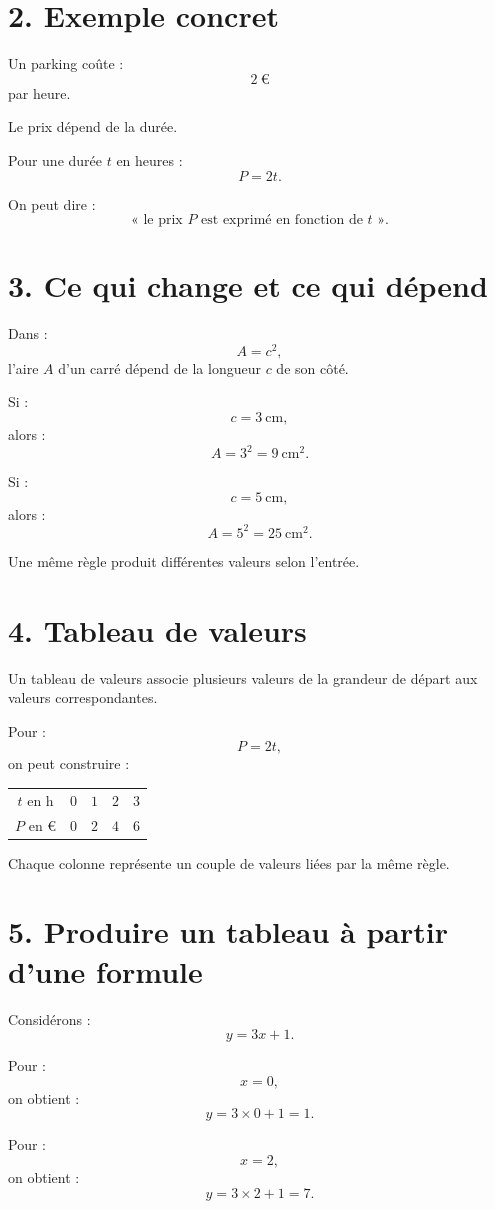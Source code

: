 \section{2. Exemple concret}

Un parking coûte :
\[
2\ \text{€}
\]
par heure.

Le prix dépend de la durée.

Pour une durée $t$ en heures :
\[
P=2t.
\]

On peut dire :
\[
\text{« le prix }P\text{ est exprimé en fonction de }t\text{ »}.
\]

\section{3. Ce qui change et ce qui dépend}

Dans :
\[
A=c^2,
\]
l'aire $A$ d'un carré dépend de la longueur $c$ de son côté.

Si :
\[
c=3\ \text{cm},
\]
alors :
\[
A=3^2=9\ \text{cm}^2.
\]

Si :
\[
c=5\ \text{cm},
\]
alors :
\[
A=5^2=25\ \text{cm}^2.
\]

Une même règle produit différentes valeurs selon l'entrée.

\section{4. Tableau de valeurs}

Un tableau de valeurs associe plusieurs valeurs de la grandeur de départ aux valeurs correspondantes.

Pour :
\[
P=2t,
\]
on peut construire :

\begin{tabular}{c|c|c|c|c}
$t$ en h & $0$ & $1$ & $2$ & $3$ \\
$P$ en € & $0$ & $2$ & $4$ & $6$ \\
\end{tabular}

Chaque colonne représente un couple de valeurs liées par la même règle.

\section{5. Produire un tableau à partir d'une formule}

Considérons :
\[
y=3x+1.
\]

Pour :
\[
x=0,
\]
on obtient :
\[
y=3\times0+1=1.
\]

Pour :
\[
x=2,
\]
on obtient :
\[
y=3\times2+1=7.
\]

